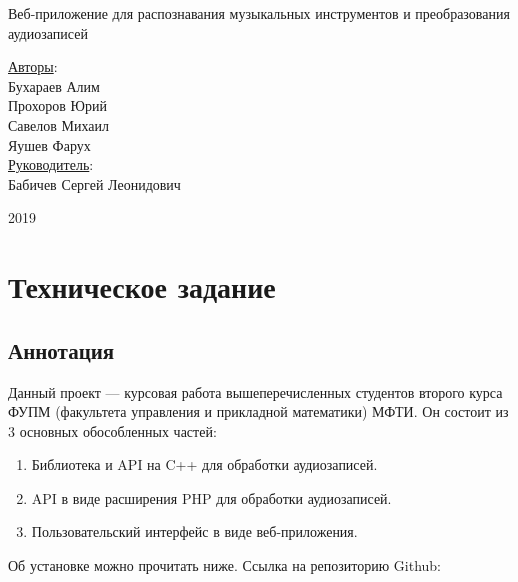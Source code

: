 \documentclass[14pt,a4paper]{article}
\begin{document}
\text{}
\vskip 8cm
\begin{center}
\begin{minipage}{0.8\textwidth}
\begin{center}
\Huge Веб-приложение для распознавания музыкальных инструментов и преобразования аудиозаписей
\end{center}
\end{minipage}
\end{center}

\vskip 5.5cm

\begin{flushright}
\Large \underline{Авторы}: \\
Бухараев Алим \\
Прохоров Юрий \\
Савелов Михаил \\
Яушев Фарух \\
\bigskip
\Large \underline{Руководитель}: \\
Бабичев Сергей Леонидович
\end{flushright}

\vskip 2.6cm

\begin{center}
2019
\end{center}

\newpage

\renewcommand\contentsname{\huge Содержание}
\setcounter{tocdepth}{2}
\Large \tableofcontents
\normalsize

\newpage 

\section[Техническое задание]{\huge Техническое задание}

\subsection{Аннотация}

Данный проект --- курсовая работа вышеперечисленных студентов второго курса ФУПМ (факультета управления и прикладной математики) МФТИ. Он состоит из 3 основных обособленных частей:
\begin{enumerate}
\item Библиотека и API на C++ для обработки аудиозаписей.
\item API в виде расширения PHP для обработки аудиозаписей.
\item Пользовательский интерфейс в виде веб-приложения.
\end{enumerate}
Об установке можно прочитать ниже. Ссылка на репозиторию Github:\\\\
\\
\end{document}
